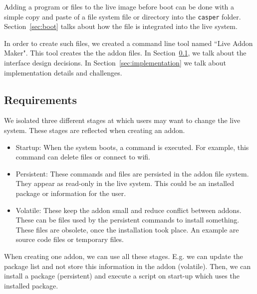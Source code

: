 \documentclass[english]{lni}
\begin{document}
Adding a program or files to the live image before boot can be done with a simple copy and paste of a file system file or directory into the \texttt{casper} folder.
Section~\ref{sec:boot} talks about how the file is integrated into the live system.

In order to create such files, we created a command line tool named ``Live Addon Maker".
This tool creates the the addon files.
In Section~\ref{sec:requirements}, we talk about the interface design decisions.
In Section~\ref{sec:implementation} we talk about implementation details and challenges.

\subsection{Requirements}
\label{sec:requirements}

We isolated three different stages at which users may want to change the live system.
These stages are reflected when creating an addon.

\begin{itemize}
  \item Startup:
        When the system boots, a command is executed.
        For example, this command can delete files or connect to wifi.
  \item Persistent:
        These commands and files are persisted in the addon file system.
        They appear as read-only in the live system.
        This could be an installed package or information for the user.
  \item Volatile:
        These keep the addon small and reduce conflict between addons.
        These can be files used by the persistent commands to install something.
        These files are obsolete, once the installation took place.
        An example are source code files or temporary files.
\end{itemize}


When creating one addon, we can use all these stages.
E.g. we can update the package list and not store this information in the addon (volatile). Then, we can install a package (persistent) and execute a script on start-up which uses the installed package.
\end{document}
